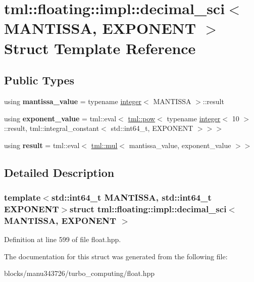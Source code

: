 \hypertarget{structtml_1_1floating_1_1impl_1_1decimal__sci}{\section{tml\+:\+:floating\+:\+:impl\+:\+:decimal\+\_\+sci$<$ M\+A\+N\+T\+I\+S\+S\+A, E\+X\+P\+O\+N\+E\+N\+T $>$ Struct Template Reference}
\label{structtml_1_1floating_1_1impl_1_1decimal__sci}
}
\subsection*{Public Types}
\begin{DoxyCompactItemize}
\item 
\hypertarget{structtml_1_1floating_1_1impl_1_1decimal__sci_a52bd10faffe434dc1b985ed4ad600e32}{using {\bfseries mantissa\+\_\+value} = typename \hyperlink{structtml_1_1floating_1_1impl_1_1integer}{integer}$<$ M\+A\+N\+T\+I\+S\+S\+A $>$\+::result}\label{structtml_1_1floating_1_1impl_1_1decimal__sci_a52bd10faffe434dc1b985ed4ad600e32}

\item 
\hypertarget{structtml_1_1floating_1_1impl_1_1decimal__sci_ae5957f6708d05fc8420d49347b1bbd8b}{using {\bfseries exponent\+\_\+value} = tml\+::eval$<$ \hyperlink{structtml_1_1pow}{tml\+::pow}$<$ typename \hyperlink{structtml_1_1floating_1_1impl_1_1integer}{integer}$<$ 10 $>$\+::result, tml\+::integral\+\_\+constant$<$ std\+::int64\+\_\+t, E\+X\+P\+O\+N\+E\+N\+T $>$$>$$>$}\label{structtml_1_1floating_1_1impl_1_1decimal__sci_ae5957f6708d05fc8420d49347b1bbd8b}

\item 
\hypertarget{structtml_1_1floating_1_1impl_1_1decimal__sci_aa6026c66a2fc82c8a462d6112c2ee5f8}{using {\bfseries result} = tml\+::eval$<$ \hyperlink{structtml_1_1mul}{tml\+::mul}$<$ mantissa\+\_\+value, exponent\+\_\+value $>$$>$}\label{structtml_1_1floating_1_1impl_1_1decimal__sci_aa6026c66a2fc82c8a462d6112c2ee5f8}

\end{DoxyCompactItemize}


\subsection{Detailed Description}
\subsubsection*{template$<$std\+::int64\+\_\+t M\+A\+N\+T\+I\+S\+S\+A, std\+::int64\+\_\+t E\+X\+P\+O\+N\+E\+N\+T$>$struct tml\+::floating\+::impl\+::decimal\+\_\+sci$<$ M\+A\+N\+T\+I\+S\+S\+A, E\+X\+P\+O\+N\+E\+N\+T $>$}



Definition at line 599 of file float.\+hpp.



The documentation for this struct was generated from the following file\+:\begin{DoxyCompactItemize}
\item 
blocks/manu343726/turbo\+\_\+computing/float.\+hpp\end{DoxyCompactItemize}
